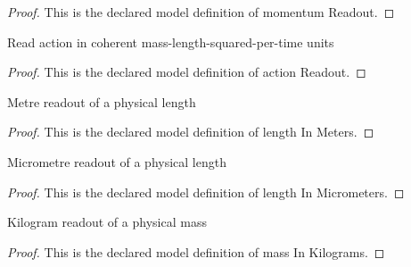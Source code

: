 \begin{proof}
  This is the declared model definition of momentum Readout.
\end{proof}
\begin{definition}
  \label{def:physics:phyx-mini-0655:phyxminiproblems-problemphyxmini0655-actionreadout}
  Read action in coherent mass-length-squared-per-time units
\end{definition}
\begin{proof}
  This is the declared model definition of action Readout.
\end{proof}
\begin{definition}
  \label{def:physics:phyx-mini-0655:phyxminiproblems-problemphyxmini0655-lengthinmeters}
  Metre readout of a physical length
\end{definition}
\begin{proof}
  This is the declared model definition of length In Meters.
\end{proof}
\begin{definition}
  \label{def:physics:phyx-mini-0655:phyxminiproblems-problemphyxmini0655-lengthinmicrometers}
  Micrometre readout of a physical length
\end{definition}
\begin{proof}
  This is the declared model definition of length In Micrometers.
\end{proof}
\begin{definition}
  \label{def:physics:phyx-mini-0655:phyxminiproblems-problemphyxmini0655-massinkilograms}
  Kilogram readout of a physical mass
\end{definition}
\begin{proof}
  This is the declared model definition of mass In Kilograms.
\end{proof}
